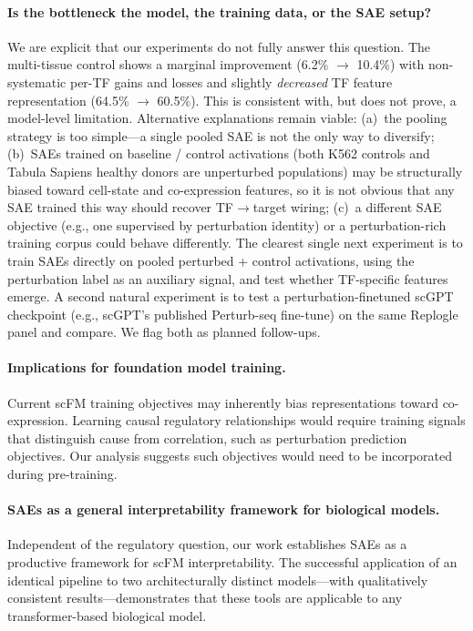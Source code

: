 \documentclass[onecolumn]{article}
\begin{document}
\paragraph{Is the bottleneck the model, the training data, or the SAE setup?}\label{sec:discussion-bottleneck}
We are explicit that our experiments do not fully answer this question. The multi-tissue control shows a marginal improvement (6.2\% $\to$ 10.4\%) with non-systematic per-TF gains and losses and slightly \emph{decreased} TF feature representation (64.5\% $\to$ 60.5\%). This is consistent with, but does not prove, a model-level limitation. Alternative explanations remain viable: (a)~the pooling strategy is too simple---a single pooled SAE is not the only way to diversify; (b)~SAEs trained on baseline / control activations (both K562 controls and Tabula Sapiens healthy donors are unperturbed populations) may be structurally biased toward cell-state and co-expression features, so it is not obvious that any SAE trained this way should recover TF$\to$target wiring; (c)~a different SAE objective (e.g., one supervised by perturbation identity) or a perturbation-rich training corpus could behave differently. The clearest single next experiment is to train SAEs directly on pooled perturbed + control activations, using the perturbation label as an auxiliary signal, and test whether TF-specific features emerge. A second natural experiment is to test a perturbation-finetuned scGPT checkpoint (e.g., scGPT's published Perturb-seq fine-tune) on the same Replogle panel and compare. We flag both as planned follow-ups.

\paragraph{Implications for foundation model training.}
Current scFM training objectives may inherently bias representations toward co-expression. Learning causal regulatory relationships would require training signals that distinguish cause from correlation, such as perturbation prediction objectives. Our analysis suggests such objectives would need to be incorporated during pre-training.

\paragraph{SAEs as a general interpretability framework for biological models.}
Independent of the regulatory question, our work establishes SAEs as a productive framework for scFM interpretability. The successful application of an identical pipeline to two architecturally distinct models---with qualitatively consistent results---demonstrates that these tools are applicable to any transformer-based biological model.
\end{document}
